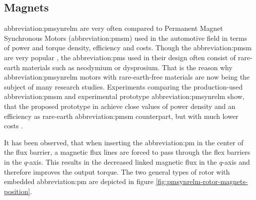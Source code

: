 \documentclass[a4paper, twoside, 11pt]{article}
\begin{document}
    \subsection{Magnets}
        \gls{abbreviation:pmsynrelm} are very often compared to Permanent Magnet Synchronous Motors (\gls{abbreviation:pmsm}) used in the automotive field in terms of power and torque density, efficiency and costs. Though the \gls{abbreviation:pmsm} are very popular \cite{morimoto-experimental-evaulation-of-a-rare-earth-free-pmasynrm-with-ferrite-magnets-for-automotive-applications}, the \gls{abbreviation:pm}s used in their design often consist of rare-earth materials such as neodymium or dysprosium. That is the reason why \gls{abbreviation:pmsynrelm} motors with rare-earth-free materials are now being the subject of many research studies. Experiments comparing the production-used \gls{abbreviation:pmsm} and experimental prototype \gls{abbreviation:pmsynrelm} show, that the proposed prototype in \cite{mashiro-performance-of-mpasynrm-with-ferrite-magnets-for-ev-hv-applications-considering-productivity} achieve close values of power density and an efficiency as rare-earth \gls{abbreviation:pmsm} counterpart, but with much lower costs \cite{haiwei-low-cost-ferrite-pm-assisted-synchronous-reluctance-machine-for-electric-vehicles}.\par
It has been observed, that when inserting the \gls{abbreviation:pm} in the center of the flux barrier, a magnetic flux lines are forced to pass through the flex barriers in the $q$-axis. This results in the decreased linked magnetic flux in the $q$-axis and therefore improves the output torque. \cite{ibrahim-permanent-magnet-assisted-synchronous-reluctance-motor-employing-a-hybrid-star-delta-winding-for-high-speed-applicaitons, ngo-performance-analysis-of-synchronous-reluctance-motor-with-limited-amount-of-permanent-magnet} The two general types of rotor with embedded \gls{abbreviation:pm} are depicted in figure \ref{fig:pmsynrelm-rotor-magnets-position}.
\end{document}

